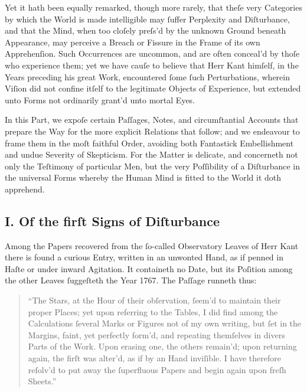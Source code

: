 \documentclass[12pt]{article}
\begin{document}
Yet it hath been equally remarked, though more rarely, that theſe very 
Categories by which the World is made intelligible may ſuffer Perplexity and 
Diſturbance, and that the Mind, when too cloſely preſs’d by the unknown Ground 
beneath Appearance, may perceive a Breach or Fissure in the Frame of its own 
Apprehenſion. Such Occurrences are uncommon, and are often conceal’d by thoſe 
who experience them; yet we have cauſe to believe that Herr Kant himſelf, in 
the Years preceding his great Work, encountered ſome ſuch Perturbations, 
wherein Viſion did not confine itſelf to the legitimate Objects of Experience, 
but extended unto Forms not ordinarily grant’d unto mortal Eyes.

In this Part, we expoſe certain Paſſages, Notes, and circumſtantial Accounts 
that prepare the Way for the more explicit Relations that follow; and we 
endeavour to frame them in the moſt faithful Order, avoiding both Fantastick 
Embellishment and undue Severity of Skepticism. For the Matter is delicate, and 
concerneth not only the Teſtimony of particular Men, but the very Poſſibility 
of a Diſturbance in the universal Forms whereby the Human Mind is fitted to the 
World it doth apprehend.

\subsection*{I. Of the firſt Signs of Diſturbance}

Among the Papers recovered from the ſo-called Observatory Leaves of Herr Kant 
there is found a curious Entry, written in an unwonted Hand, as if penned in 
Haſte or under inward Agitation. It containeth no Date, but its Poſition among 
the other Leaves ſuggeſteth the Year 1767. The Paſſage runneth thus:

\begin{quote}
\small
“The Stars, at the Hour of their obſervation, ſeem’d to maintain their proper 
Places; yet upon referring to the Tables, I did find among the Calculations 
ſeveral Marks or Figures not of my own writing, but ſet in the Margins, faint, 
yet perfectly form’d, and repeating themſelves in divers Parts of the Work. 
Upon erasing one, the others remain’d; upon returning again, the firſt was 
alter’d, as if by an Hand inviſible. I have therefore reſolv’d to put away the 
ſuperfluous Papers and begin again upon freſh Sheets.”
\end{quote}
\end{document}
